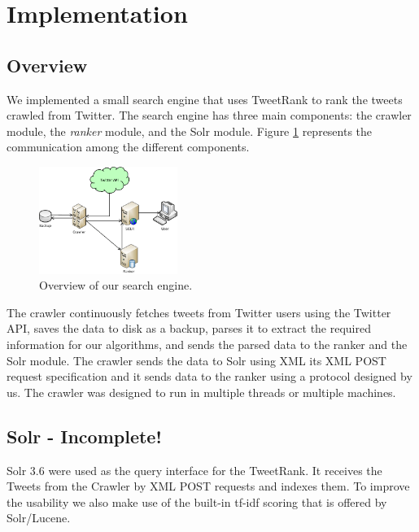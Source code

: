 \section {Implementation}

\subsection{Overview}
We implemented a small search engine that uses TweetRank to rank the tweets crawled from Twitter. The search engine has three main components: the crawler module, the \emph{ranker} module, and the Solr module. Figure \ref{fig:overview} represents the communication among the different components.

\begin{figure}
\centering
\includegraphics[width=0.4\textwidth]{../tweetmap.png} 
\caption{Overview of our search engine.}
\label{fig:overview}
\end{figure}

The crawler continuously fetches tweets from Twitter users using the Twitter API, saves the data to disk as a backup, parses it to extract the required information for our algorithms, and sends the parsed data to the ranker and the Solr module. The crawler sends the data to Solr using XML its XML POST request specification and it sends data to the ranker using a protocol designed by us. The crawler was designed to run in multiple threads or multiple machines.





\subsection{Solr - Incomplete!}
Solr 3.6 were used as the query interface for the TweetRank. It receives the Tweets from the Crawler by XML POST requests and indexes them. To improve the usability we also make use of the built-in tf-idf scoring that is offered by Solr/Lucene.


